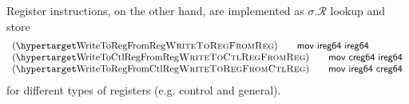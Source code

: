   Register instructions, on the other hand, are implemented as $\sigma.\mathcal{R}$ lookup and store
\[
\begin{array}{l}
  \hbox{(\TirNameStyle{WriteToRegFromReg})} \qquad 
  \textsf{mov ireg64 ireg64} \\
  \hbox{(\TirNameStyle{WriteToCtlRegFromReg})} \qquad 
  \textsf{mov creg64 ireg64}\\
    \hbox{(\TirNameStyle{WriteToRegFromCtlReg})} \qquad 
  \textsf{mov ireg64 creg64}
  \end{array}
\]
for different types of registers (e.g. control and general).
%
